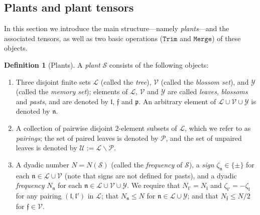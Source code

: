 \documentclass[11 pt,reqno]{amsart}
\theoremstyle{definition}
\newtheorem{df}[thm]{Definition}
\theoremstyle{remark}
\numberwithin{equation}{section}
\newcommand{\Sc}{\mathcal{S}}
\newcommand{\Lc}{\mathcal{L}}
\newcommand{\Pc}{\mathcal{P}}
\newcommand{\Uc}{\mathcal{U}}
\newcommand{\Vc}{\mathcal{V}}
\newcommand{\Yc}{\mathcal{Y}}
\newcommand{\pf}{\mathfrak{p}}
\newcommand{\ff}{\mathfrak{f}}
\newcommand{\nf}{\mathfrak{n}}
\newcommand{\lf}{\mathfrak{l}}
\begin{document}
{\subsection{Plants and plant tensors}\label{defplant} In this section we introduce the main structure---namely \emph{plants}---and the associated tensors, as well as two basic operations ($\mathtt{Trim}$ and $\mathtt{Merge}$) of these objects.
 \begin{df}[Plants]\label{defstr} A \emph{plant} $\Sc$ consists of the following objects:
 \begin{enumerate}
 \item Three disjoint finite sets $\Lc$ (called the \emph{tree}), $\Vc$ (called the \emph{blossom set}), and $\Yc$ (called the \emph{memory set}); elements of $\Lc$, $\Vc$ and $\Yc$ are called \emph{leaves}, \emph{blossoms} and \emph{pasts}, and are denoted by $\lf$, $\ff$ and $\pf$. An arbitrary element of $\Lc\cup\Vc\cup\Yc$ is denoted by $\nf$.
 \item A collection of pairwise disjoint $2$-element subsets of $\Lc$, which we refer to as \emph{pairings}; the set of paired leaves is denoted by $\Pc$, and the set of unpaired leaves is denoted by $\Uc:=\Lc\backslash\Pc$.
 \item A dyadic number $N=N(\Sc)$ (called the \emph{frequency} of $\Sc$), a \emph{sign} $\zeta_{\nf}\in\{\pm\}$ for each $\nf\in\Lc\cup\Vc$ (note that signs are not defined for pasts),  and a dyadic \emph{frequency} $N_\nf$ for each $\nf\in\Lc\cup\Vc\cup\Yc$. We require that $N_{\lf'}=N_{\lf}$ and $\zeta_{\lf'}=-\zeta_\lf$ for any pairing $(\lf,\lf')$ in $\Lc$; that $N_\nf\leq N$ for $\nf\in\Lc\cup\Yc$; and that $ N_\ff\leq N/2$ for $\ff\in\Vc$.
 \end{enumerate} 
 

\end{df}}
\end{document}
